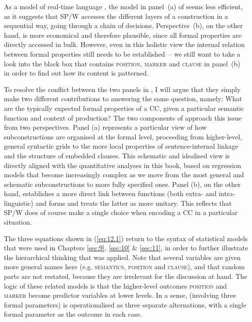 As a model of real-time language , the model in panel~(a) of  seems less efficient, as it suggests that SP/W accesses the different layers of a construction in a sequential way, going through a chain of decisions. Perspective~(b), on the other hand, is more economical and therefore plausible, since all formal properties are directly accessed in bulk. However, even in this holistic view the internal relation between formal properties still needs to be established~– we still want to take a look into the black box that contains \textsc{position}, \textsc{marker} and \textsc{clause} in panel~(b) in order to find out how its content is patterned.

To resolve the conflict between the two panels in , I will argue that they simply make two different contributions to answering the same question, namely: What are the typically expected formal properties of a CC, given a particular semantic function and context of production? The two components of  approach this issue from two perspectives. Panel (a) represents a particular view of how subconstructions are organised at the formal level, proceeding from higher-level, general syntactic grids to the more local properties of sentence-internal linkage and the structure of embedded clauses. This schematic and idealised view is directly aligned with the quantitative analyses in this book, based on regression models that become increasingly complex as we move from the most general and schematic subconstructions to more fully specified ones. Panel (b), on the other hand, establishes a more direct link between functions (both extra- and intra-linguistic) and forms and treats the latter as more unitary. This reflects that SP/W does of course make a single choice when encoding a CC in a particular situation.

The three equations shown in (\ref{eq:12.1}) return to the syntax of statistical models that were used in Chapters \ref{sec:9}, \ref{sec:10} \& \ref{sec:11}, in order to further illustrate the hierarchical thinking that was applied. Note that several variables are given more general names here (e.g. \textsc{semantics}, \textsc{position} and \textsc{clause}), and that random parts are not restated, because they are irrelevant for the discussion at hand. The logic of these related models is that the higher-level outcomes \textsc{position} and \textsc{marker} become predictor variables at lower levels. In a sense,  (involving three formal parameters) is operationalised as three separate alternations, with a single formal parameter as the outcome in each case.

